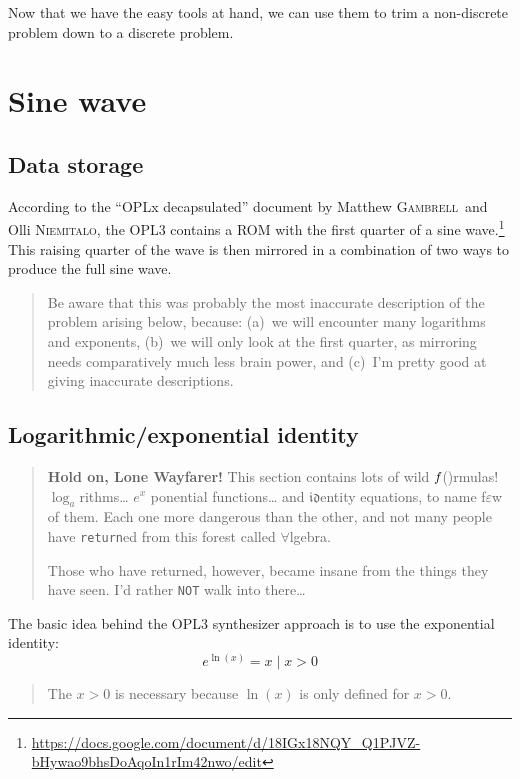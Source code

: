 \documentclass[english]{scrartcl}
\newcommand{\noun}[1]{\textsc{#1}}
\newcommand{\code}[1]{\texttt{#1}}
\newenvironment{details}{
\par\nobreak\noindent%
\begin{quotation}%
  \footnotesize%
  \noindent\Radioactivity%
}{
\end{quotation}
}
\begin{document}
Now that we have the easy tools at hand, we can use them to trim a non-discrete problem down to a discrete problem.



\section{Sine wave}


\subsection{Data storage}
According to the ``OPLx decapsulated'' document by Matthew \noun{Gambrell}~and Olli \noun{Niemitalo}, the OPL3 contains a ROM with the first quarter of a sine wave.\footnote{\url{https://docs.google.com/document/d/18IGx18NQY_Q1PJVZ-bHywao9bhsDoAqoIn1rIm42nwo/edit}}
This raising quarter of the wave is then mirrored in a combination of two ways to produce the full sine wave.

\begin{details}
Be aware that this was probably the most inaccurate description of the problem arising below, because: (a)~we will encounter many logarithms and exponents, (b)~we will only look at the first quarter, as mirroring needs comparatively much less brain power, and (c)~I'm pretty good at giving inaccurate descriptions.
\end{details}


\subsection{Logarithmic/exponential identity}

\begin{quotation}
\textbf{Hold on, Lone Wayfarer!}
This section contains lots of wild $f\kern-1pt$\hbox{\scriptsize ()}rmulas!
$\log_a$rithms\ldots
$e^x$\kern-1pt ponential functions\ldots
and $\mathfrak{id}$entity equations, to name f$\varepsilon$w of them.
Each one more dangerous than the other, and not many people have \code{return}ed from this forest called $\forall$lgebra.

Those who have returned, however, became insane from the things they have seen.
I'd rather \code{NOT} walk into there\ldots
\end{quotation}

The basic idea behind the OPL3 synthesizer approach is to use the exponential identity:
\[ e^{\ln(x)} = x \mid x>0 \]

\begin{details}
The $x>0$ is necessary because $\ln(x)$ is only defined for $x>0$.
\end{details}
\end{document}
